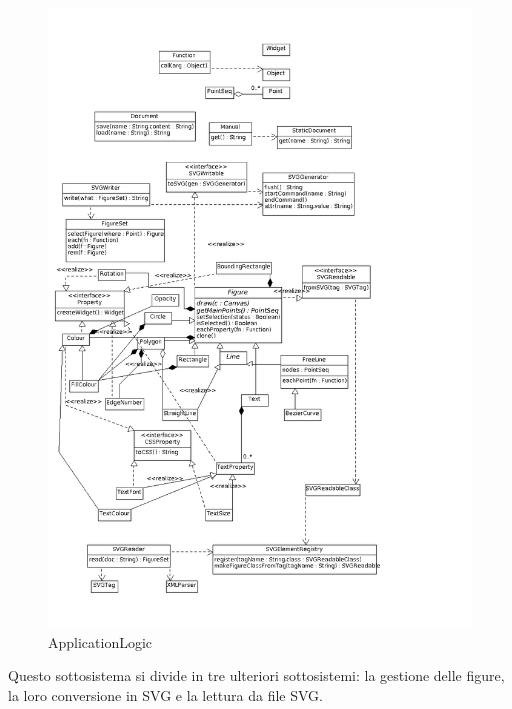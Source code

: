 \begin{figure}[!ht]
\centering
\includegraphics[scale=0.4]{images/applogic.png}
\caption{ApplicationLogic}
\end{figure}

Questo sottosistema si divide in tre ulteriori sottosistemi: la gestione delle
figure, la loro conversione in SVG e la lettura da file SVG.

